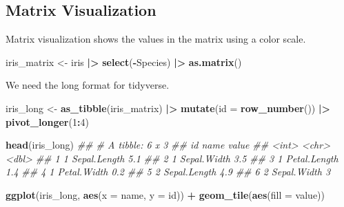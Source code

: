 \documentclass[
  notitlepage]{book}
\newenvironment{Shaded}{\begin{snugshade}}{\end{snugshade}}
\newcommand{\CommentTok}[1]{\textcolor[rgb]{0.56,0.35,0.01}{\textit{#1}}}
\newcommand{\DataTypeTok}[1]{\textcolor[rgb]{0.13,0.29,0.53}{#1}}
\newcommand{\DecValTok}[1]{\textcolor[rgb]{0.00,0.00,0.81}{#1}}
\newcommand{\ErrorTok}[1]{\textcolor[rgb]{0.64,0.00,0.00}{\textbf{#1}}}
\newcommand{\KeywordTok}[1]{\textcolor[rgb]{0.13,0.29,0.53}{\textbf{#1}}}
\newcommand{\NormalTok}[1]{#1}
\newcommand{\OperatorTok}[1]{\textcolor[rgb]{0.81,0.36,0.00}{\textbf{#1}}}
\newcommand{\StringTok}[1]{\textcolor[rgb]{0.31,0.60,0.02}{#1}}
\begin{document}
\hypertarget{matrix-visualization}{%
\subsection{Matrix Visualization}\label{matrix-visualization}}

Matrix visualization shows the values in the matrix using a color scale.

\begin{Shaded}
\begin{Highlighting}[]
\NormalTok{iris\_matrix \textless{}{-}}\StringTok{ }\NormalTok{iris }\OperatorTok{|}\ErrorTok{\textgreater{}}\StringTok{ }\KeywordTok{select}\NormalTok{(}\OperatorTok{{-}}\NormalTok{Species) }\OperatorTok{|}\ErrorTok{\textgreater{}}\StringTok{ }\KeywordTok{as.matrix}\NormalTok{()}
\end{Highlighting}
\end{Shaded}

We need the long format for tidyverse.

\begin{Shaded}
\begin{Highlighting}[]
\NormalTok{iris\_long \textless{}{-}}\StringTok{ }\KeywordTok{as\_tibble}\NormalTok{(iris\_matrix) }\OperatorTok{|}\ErrorTok{\textgreater{}}\StringTok{ }
\StringTok{  }\KeywordTok{mutate}\NormalTok{(}\DataTypeTok{id =} \KeywordTok{row\_number}\NormalTok{()) }\OperatorTok{|}\ErrorTok{\textgreater{}}\StringTok{ }
\StringTok{  }\KeywordTok{pivot\_longer}\NormalTok{(}\DecValTok{1}\OperatorTok{:}\DecValTok{4}\NormalTok{)}

\KeywordTok{head}\NormalTok{(iris\_long)}
\CommentTok{\#\# \# A tibble: 6 x 3}
\CommentTok{\#\#      id name         value}
\CommentTok{\#\#   \textless{}int\textgreater{} \textless{}chr\textgreater{}        \textless{}dbl\textgreater{}}
\CommentTok{\#\# 1     1 Sepal.Length   5.1}
\CommentTok{\#\# 2     1 Sepal.Width    3.5}
\CommentTok{\#\# 3     1 Petal.Length   1.4}
\CommentTok{\#\# 4     1 Petal.Width    0.2}
\CommentTok{\#\# 5     2 Sepal.Length   4.9}
\CommentTok{\#\# 6     2 Sepal.Width    3}
\end{Highlighting}
\end{Shaded}

\begin{Shaded}
\begin{Highlighting}[]
\KeywordTok{ggplot}\NormalTok{(iris\_long, }\KeywordTok{aes}\NormalTok{(}\DataTypeTok{x =}\NormalTok{ name, }\DataTypeTok{y =}\NormalTok{ id)) }\OperatorTok{+}\StringTok{ }
\StringTok{  }\KeywordTok{geom\_tile}\NormalTok{(}\KeywordTok{aes}\NormalTok{(}\DataTypeTok{fill =}\NormalTok{ value))}
\end{Highlighting}
\end{Shaded}
\end{document}
